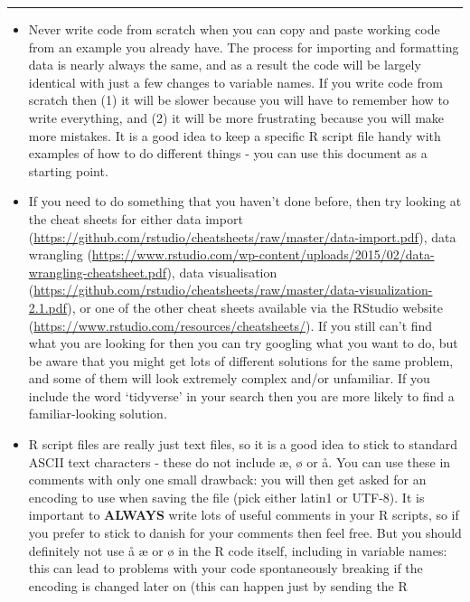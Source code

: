 \documentclass[
]{article}
\begin{document}
\begin{center}\rule{0.5\linewidth}{0.5pt}\end{center}

\begin{itemize}
\item
  Never write code from scratch when you can copy and paste working code
  from an example you already have. The process for importing and
  formatting data is nearly always the same, and as a result the code
  will be largely identical with just a few changes to variable names.
  If you write code from scratch then (1) it will be slower because you
  will have to remember how to write everything, and (2) it will be more
  frustrating because you will make more mistakes. It is a good idea to
  keep a specific R script file handy with examples of how to do
  different things - you can use this document as a starting point.
\item
  If you need to do something that you haven't done before, then try
  looking at the cheat sheets for either data import
  (\url{https://github.com/rstudio/cheatsheets/raw/master/data-import.pdf}),
  data wrangling
  (\url{https://www.rstudio.com/wp-content/uploads/2015/02/data-wrangling-cheatsheet.pdf}),
  data visualisation
  (\url{https://github.com/rstudio/cheatsheets/raw/master/data-visualization-2.1.pdf}),
  or one of the other cheat sheets available via the RStudio website
  (\url{https://www.rstudio.com/resources/cheatsheets/}). If you still
  can't find what you are looking for then you can try googling what you
  want to do, but be aware that you might get lots of different
  solutions for the same problem, and some of them will look extremely
  complex and/or unfamiliar. If you include the word `tidyverse' in your
  search then you are more likely to find a familiar-looking solution.
\item
  R script files are really just text files, so it is a good idea to
  stick to standard ASCII text characters - these do not include æ, ø or
  å. You can use these in comments with only one small drawback: you
  will then get asked for an encoding to use when saving the file (pick
  either latin1 or UTF-8). It is important to \textbf{ALWAYS} write lots
  of useful comments in your R scripts, so if you prefer to stick to
  danish for your comments then feel free. But you should definitely not
  use å æ or ø in the R code itself, including in variable names: this
  can lead to problems with your code spontaneously breaking if the
  encoding is changed later on (this can happen just by sending the R

\end{itemize}
\end{document}
